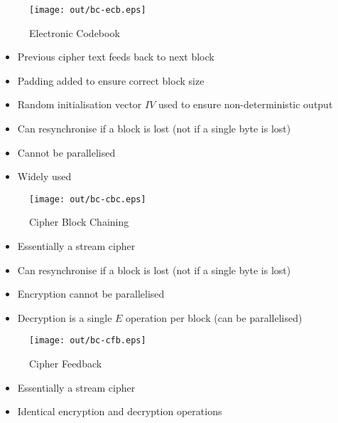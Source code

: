 \documentclass[a4paper]{article}
\begin{document}
\begin{figure}[h!]
  \centering
  \texttt{[image: out/bc-ecb.eps]}
  \caption{Electronic Codebook}
  \label{fig:bc-ecb}
\end{figure}
\FloatBarrier


\begin{itemize}
  \item Previous cipher text feeds back to next block
  \item Padding added to ensure correct block size
  \item Random initialisation vector $IV$ used to ensure non-deterministic
        output
  \item Can resynchronise if a block is lost (not if a single byte is lost)
  \item Cannot be parallelised
  \item Widely used
\end{itemize}

\begin{figure}[h!]
  \centering
  \texttt{[image: out/bc-cbc.eps]}
  \caption{Cipher Block Chaining}
  \label{fig:bc-cbc}
\end{figure}
\FloatBarrier


\begin{itemize}
  \item Essentially a stream cipher
  \item Can resynchronise if a block is lost (not if a single byte is lost)
  \item Encryption cannot be parallelised
  \item Decryption is a single $E$ operation per block (can be parallelised)
\end{itemize}

\begin{figure}[h!]
  \centering
  \texttt{[image: out/bc-cfb.eps]}
  \caption{Cipher Feedback}
  \label{fig:bc-cfb}
\end{figure}
\FloatBarrier


\begin{itemize}
  \item Essentially a stream cipher
  \item Identical encryption and decryption operations
\end{itemize}
\end{document}

